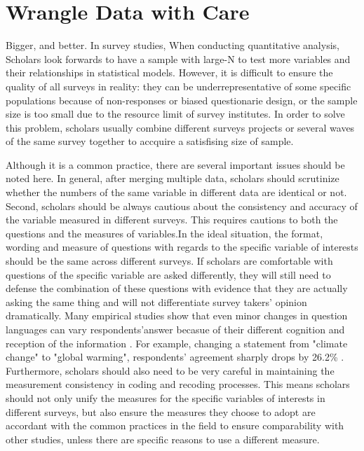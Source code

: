 

\section{Wrangle Data with Care}
Bigger, and better. In survey studies, When conducting quantitative analysis, Scholars look forwards to have a sample with large-N to test more variables and their relationships in statistical models. However, it is difficult to ensure the quality of all surveys in reality: they can be underrepresentative of some specific populations because of  non-responses or biased questionarie design, or the sample size is too small due to the resource limit of survey institutes. In order to solve this problem, scholars usually combine different surveys projects or several waves of the same survey together to accquire a satisfising size of sample. 

Although it is a common practice, there are several important issues should be noted here. In general, after merging multiple data, scholars should scrutinize whether the numbers of the same variable in different data are identical or not. Second, scholars should be always cautious about the consistency and accuracy of the variable measured in different surveys. This requires cautions to both the questions and the measures of variables.In the ideal situation, the format, wording and measure of questions with regards to the specific variable of interests should be the same across different surveys. If scholars are comfortable with questions of the specific variable are asked differently, they will still need to defense the combination of these questions with evidence that they are actually asking the same thing and will not differentiate survey takers' opinion dramatically. Many empirical studies show that even minor changes in question languages can vary respondents'answer becasue of their different cognition and reception of the information \citep{Bishop1978, Rasinski1989, Zaller1992, Bertrand2001}.  For example, changing a statement from "climate change" to "global warming", respondents' agreement sharply drops by 26.2\% \citep{Schuldt2011}. Furthermore, scholars should also need to be very careful in maintaining the measurement consistency in coding and recoding processes. This means scholars should not only unify the measures for the specific variables of interests in different surveys, but also ensure the measures they choose to adopt are accordant with the common practices in the field to ensure comparability with other studies, unless there are specific reasons to use a different measure. 


